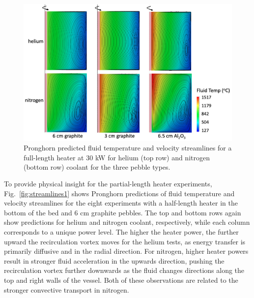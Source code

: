 \begin{figure}[h!]
\centering
\centerline{
\includegraphics[height=0.55\linewidth]{figs/sana_30kW_vel.png}}
\caption{Pronghorn predicted fluid temperature and velocity streamlines for a full-length heater at 30 \si{\kilo\watt} for helium (top row) and nitrogen (bottom row) coolant for the three pebble types.}
\label{fig:streamlines2}
\end{figure}

To provide physical insight for the partial-length heater experiments, Fig.\ \ref{fig:streamlines1} shows Pronghorn predictions of fluid temperature and velocity streamlines for the eight experiments with a half-length heater in the bottom of the bed and 6 \si{\centi\meter} graphite pebbles. The top and bottom rows again show predictions for helium and nitrogen coolant, respectively, while each column corresponds to a unique power level. The higher the heater power, the further upward the recirculation vortex moves for the helium tests, as energy transfer is primarily diffusive and in the radial direction. For nitrogen, higher heater powers result in stronger fluid acceleration in the upwards direction, pushing the recirculation vortex further downwards as the fluid changes directions along the top and right walls of the vessel. Both of these observations are related to the stronger convective transport in nitrogen.

